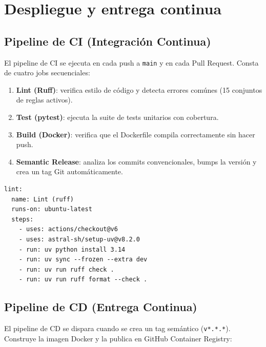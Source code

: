 \section{Despliegue y entrega continua}
\label{sec:deployment}

\subsection{Pipeline de CI (Integraci\'on Continua)}

El pipeline de CI se ejecuta en cada push a \texttt{main} y en cada Pull Request. Consta de cuatro jobs secuenciales:

\begin{enumerate}
    \item \textbf{Lint (Ruff)}: verifica estilo de c\'odigo y detecta errores com\'unes (15 conjuntos de reglas activos).
    \item \textbf{Test (pytest)}: ejecuta la suite de tests unitarios con cobertura.
    \item \textbf{Build (Docker)}: verifica que el Dockerfile compila correctamente sin hacer push.
    \item \textbf{Semantic Release}: analiza los commits convencionales, bumps la versi\'on y crea un tag Git autom\'aticamente.
\end{enumerate}

\begin{lstlisting}[language={}, caption={Fragmento de ci.yml --- Job de lint.}]
lint:
  name: Lint (ruff)
  runs-on: ubuntu-latest
  steps:
    - uses: actions/checkout@v6
    - uses: astral-sh/setup-uv@v8.2.0
    - run: uv python install 3.14
    - run: uv sync --frozen --extra dev
    - run: uv run ruff check .
    - run: uv run ruff format --check .
\end{lstlisting}

\subsection{Pipeline de CD (Entrega Continua)}

El pipeline de CD se dispara cuando se crea un tag sem\'antico (\texttt{v*.*.*}). Construye la imagen Docker y la publica en GitHub Container Registry:

